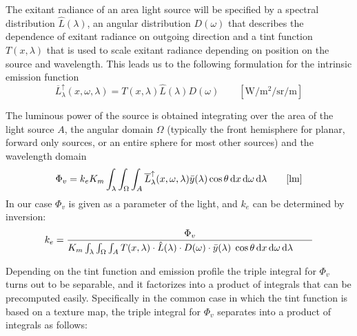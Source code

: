The exitant radiance of an area light source will be specified by a spectral
distribution $\hat{L}(\lambda)$, an angular distribution $D(\omega)$ that
describes the dependence of exitant radiance on outgoing direction and a tint
function $T(x,\lambda)$ that is used to scale exitant radiance depending on
position on the source and wavelength. This leads us to the following
formulation for the intrinsic emission function
\begin{equation}
\overline{L}^\uparrow_{\lambda}(x, \omega, \lambda) = T(x, \lambda)
\hat{L}(\lambda) D(\omega)
\qquad \left[\unit{\watt\per\square\meter\per\steradian\per\meter}\right]
\end{equation}

The luminous power of the source is obtained integrating over the area of the
light source $A$, the angular domain $\Omega$ (typically the front hemisphere
for planar, forward only sources, or an entire sphere for most other sources)
and the wavelength domain
\begin{equation}
\Phi_v = k_e K_m \int_\lambda \int_\Omega \int_A
\overline{L}^\uparrow_{\lambda}(x, \omega, \lambda) \bar y (\lambda) \cos\theta
\d x \d\omega \d\lambda
\qquad [\unit{\lumen}]
\end{equation}
In our case $\Phi_v$ is given as a parameter of the light, and $k_e$ can be
determined by inversion:
\begin{equation}
k_e = \frac{\Phi_v}{K_m \int_\lambda \int_\Omega \int_A T(x, \lambda) \cdot
\hat{L}(\lambda) \cdot D(\omega) \cdot \bar y (\lambda) \; \cos\theta \mathop{}\!\mathrm{d} x \mathop{}\!\mathrm{d}\omega
\mathop{}\!\mathrm{d}\lambda \qquad}
\end{equation}

Depending on the tint function and emission profile the triple integral for
$\Phi_v$ turns out to be separable, and it factorizes into a product of
integrals that can be precomputed easily.
Specifically in the common case in which the tint function is based on a texture
map, the triple integral for $\Phi_v$ separates into a product of integrals as
follows:

